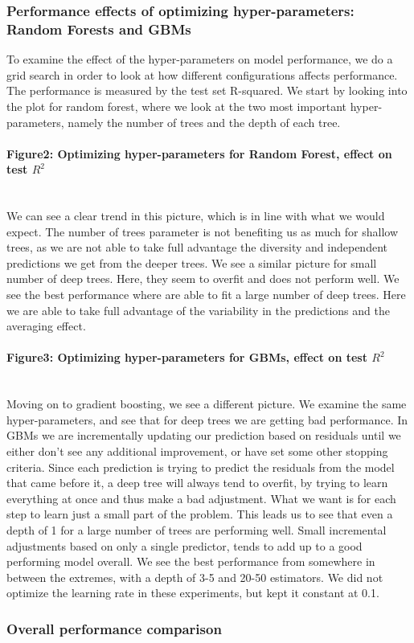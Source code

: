 \documentclass[10pt, a4paper, twocolumn]{article}
\newcommand{\myparagraph}[1]{\paragraph{#1}\mbox{}\\}
\begin{document}
		\subsubsection{Performance effects of optimizing hyper-parameters: Random Forests and GBMs}
			To examine the effect of the hyper-parameters on model performance, we do a grid search in order to look at how different configurations affects performance. The performance is measured by the test set R-squared. We start by looking into the plot for random forest, where we look at the two most important hyper-parameters, namely the number of trees and the depth of each tree.
			\myparagraph{Figure2: Optimizing hyper-parameters for Random Forest, effect on test $R^2$}
			We can see a clear trend in this picture, which is in line with what we would expect. The number of trees parameter is not benefiting us as much for shallow trees, as we are not able to take full advantage the diversity and independent predictions we get from the deeper trees. We see a similar picture for small number of deep trees. Here, they seem to overfit and does not perform well. We see the best performance where are able to fit a large number of deep trees. Here we are able to take full advantage of the variability in the predictions and the averaging effect.
			\myparagraph{Figure3: Optimizing hyper-parameters for GBMs, effect on test $R^2$}
			Moving on to gradient boosting, we see a different picture. We examine the same hyper-parameters, and see that for deep trees we are getting bad performance. In GBMs we are incrementally updating our prediction based on residuals until we either don't see any additional improvement, or have set some other stopping criteria. Since each prediction is trying to predict the residuals from the model that came before it, a deep tree will always tend to overfit, by trying to learn everything at once and thus make a bad adjustment. What we want is for each step to learn just a small part of the problem. This leads us to see that even a depth of 1 for a large number of trees are performing well. Small incremental adjustments based on only a single predictor, tends to add up to a good performing model overall. We see the best performance from somewhere in between the extremes, with a depth of 3-5 and 20-50 estimators. We did not optimize the learning rate in these experiments, but kept it constant at 0.1.
		\subsubsection{Overall performance comparison}
			
\end{document}

